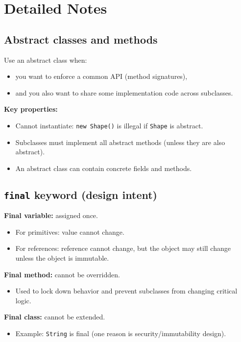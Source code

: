 \documentclass[11pt]{article}
\begin{document}
\section{Detailed Notes}
\subsection{Abstract classes and methods}
Use an abstract class when:
\begin{itemize}
  \item you want to enforce a common API (method signatures),
  \item and you also want to share some implementation code across subclasses.
\end{itemize}

\textbf{Key properties:}
\begin{itemize}
  \item Cannot instantiate: \texttt{new Shape()} is illegal if \texttt{Shape} is abstract.
  \item Subclasses must implement all abstract methods (unless they are also abstract).
  \item An abstract class can contain concrete fields and methods.
\end{itemize}

\subsection{\texttt{final} keyword (design intent)}
\textbf{Final variable:} assigned once.
\begin{itemize}
  \item For primitives: value cannot change.
  \item For references: reference cannot change, but the object may still change unless the object is immutable.
\end{itemize}

\textbf{Final method:} cannot be overridden.
\begin{itemize}
  \item Used to lock down behavior and prevent subclasses from changing critical logic.
\end{itemize}

\textbf{Final class:} cannot be extended.
\begin{itemize}
  \item Example: \texttt{String} is final (one reason is security/immutability design).
\end{itemize}
\end{document}
